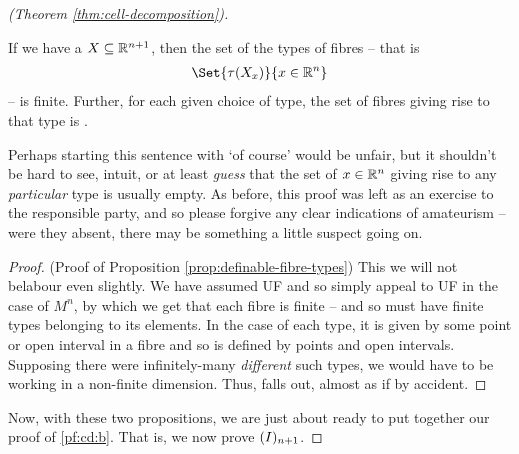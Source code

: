 \begin{proof}[\CD (Theorem \ref{thm:cell-decomposition})]
    \begin{proposition}
      \label{prop:definable-fibre-types}
      If we have a  $X \subseteq \R^{n+1}$, then the set of the types of fibres -- that is
      \begin{align*}
        \Set{\tau(X_x)}{x \in \R^n}
      \end{align*}
      -- is finite. Further, for each given choice of type, the set of fibres giving rise to that type is .
    \end{proposition}
    Perhaps starting this sentence with `of course' would be unfair, but it shouldn't be hard to see, intuit, or at least \emph{guess} that the set of $x \in \R^n$ giving rise to any \emph{particular} type is usually empty. As before, this proof was left as an exercise to the responsible party, and so please forgive any clear indications of amateurism -- were they absent, there may be something a little suspect going on.

    \begin{proof}(Proof of Proposition \ref{prop:definable-fibre-types})
      This we will not belabour even slightly. We have assumed UF and so simply appeal to UF in the case of $M^{n}$, by which we get that each fibre is finite -- and so must have finite types belonging to its elements. In the case of each type, it is given by some point or open interval in a fibre and so is defined by points and open intervals. Supposing there were infinitely-many \emph{different} such types, we would have to be working in a non-finite dimension. Thus,  falls out, almost as if by accident.
    \end{proof}

    Now, with these two propositions, we are just about ready to put together our proof of \ref{pf:cd:b}. That is, we now prove $\In[n+1]$.


\end{proof}
